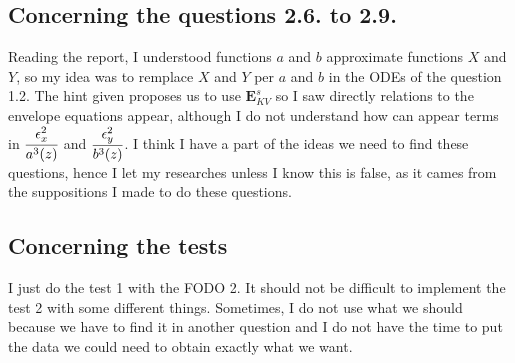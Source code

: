 \documentclass[10pt]{article}
\begin{document}
\subsection{Concerning the questions 2.6. to 2.9.}


Reading the report, I understood functions $a$ and $b$ approximate functions $X$ and $Y$, so my idea was to remplace $X$ and $Y$ per $a$ and $b$ in the ODEs of the question 1.2. The hint given proposes us to use $\mathbf{E}^s_{KV}$ so I saw directly relations to the envelope equations appear, although I do not understand how can appear terms in $\cfrac{\epsilon_{x}^2}{a^3(z)}$ and $\cfrac{\epsilon_{y}^2}{b^3(z)}$. I think I have a part of the ideas we need to find these questions, hence I let my researches unless I know this is false, as it cames from the suppositions I made to do these questions.


\subsection{Concerning the tests}


I just do the test 1 with the FODO 2. It should not be difficult to implement the test 2 with some different things. Sometimes, I do not use what we should because we have to find it in another question and I do not have the time to put the data we could need to obtain exactly what we want.
\end{document}
